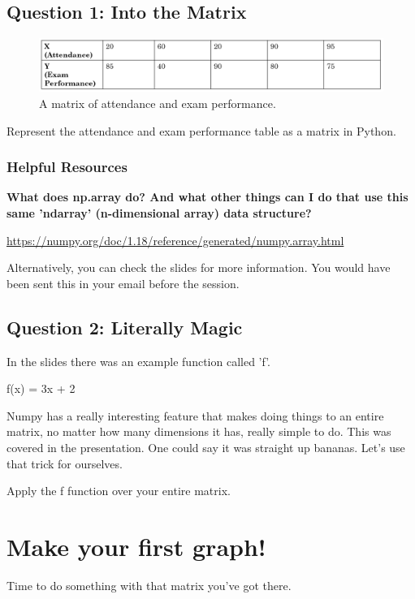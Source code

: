 \documentclass{article}
\newenvironment{reusefigure}[2][htbp]
  {\addtocounter{figure}{-1}%
   \renewcommand{\theHfigure}{dupe-fig}%
   \renewcommand{\thefigure}{\ref{#2}}%
   \renewcommand{\addcontentsline}[3]{}%
   \begin{figure}[#1]}
  {\end{figure}}
\begin{document}
    \subsection{Question 1: Into the Matrix}
    \begin{reusefigure}[H]{fig:attendance}
        \begin{center}
            \includegraphics[width=\textwidth]{../figures/attendance-example}
            \caption{A matrix of attendance and exam performance.}
        \end{center}
    \end{reusefigure}

    Represent the attendance and exam performance table as a matrix in Python.

    \subsubsection{Helpful Resources}
    \bfseries What does np.array do? And what other things can I do that use this same 'ndarray' (n-dimensional array) data structure? \mdseries

    \url{https://numpy.org/doc/1.18/reference/generated/numpy.array.html}

    Alternatively, you can check the slides for more information. You would have been sent this in your email before the session.

    \subsection{Question 2: Literally Magic}
    In the slides there was an example function called 'f'.

    f(x) = 3x + 2

    Numpy has a really interesting feature that makes doing things to an entire matrix, no matter how many dimensions it has, really simple to do. This was covered in the presentation. One could say it was straight up bananas. Let's use that trick for ourselves.

    Apply the f function over your entire matrix.

    \section{Make your first graph!}
    Time to do something with that matrix you've got there.
\end{document}
